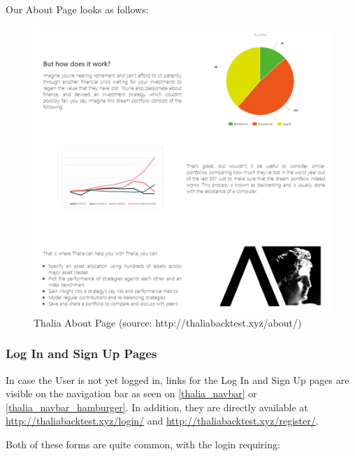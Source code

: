 \documentclass[main.tex]{subfiles}
\begin{document}
Our About Page looks as follows:



\begin{figure}[H]

   \centering

   \includegraphics[width=\textwidth]{08Appendices/081User/081Pictures/about.png}

   \caption{Thalia About Page (source: http://thaliabacktest.xyz/about/)}

   \label{thalia_about}

\end{figure}



\subsubsection{Log In and Sign Up Pages}

In case the User is not yet logged in, links for the Log In and Sign Up pages are visible on the navigation bar as seen on \figurename{\ref{thalia_navbar}} or \figurename{\ref{thalia_navbar_hamburger}}. In addition, they are directly available at \url{http://thaliabacktest.xyz/login/} and \url{http://thaliabacktest.xyz/register/}.

Both of these forms are quite common, with the login requiring:
\end{document}
